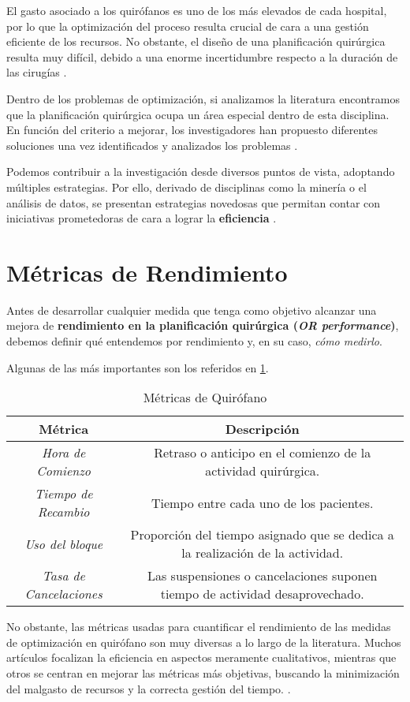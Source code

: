 El gasto asociado a los quirófanos es uno de los más elevados de cada hospital, por lo que la optimización del proceso resulta crucial de cara a una gestión eficiente de los recursos.
No obstante, el diseño de una planificación quirúrgica resulta muy difícil, debido a una enorme incertidumbre respecto a la duración de las cirugías \cite{Celik2023APrinciple}.

Dentro de los problemas de optimización, si analizamos la literatura encontramos que la planificación quirúrgica ocupa un área especial dentro de esta disciplina.
En función del criterio a mejorar, los investigadores han propuesto diferentes soluciones una vez identificados y analizados los problemas \cite{Gur2018ApplicationOverview}.

Podemos contribuir a la investigación desde diversos puntos de vista, adoptando múltiples estrategias.
Por ello, derivado de disciplinas como la minería o el análisis de datos, se presentan estrategias novedosas que permitan contar con iniciativas prometedoras de cara a lograr la \textbf{eficiencia }\cite{Schouten2023OperatingReview}.
\newpage

\section{Métricas de Rendimiento}
Antes de desarrollar cualquier medida que tenga como objetivo alcanzar una mejora de \textbf{rendimiento en la planificación quirúrgica (\textit{OR performance})}, debemos definir qué entendemos por rendimiento y, en su caso, \textit{cómo medirlo}. 

Algunas de las más importantes son los referidos en \ref{Métricas de Quirófano}.
\begin{table}[]
    \centering
    \begin{tabular}{c|c}
        \toprule
            \textbf{Métrica}   &  \textbf{Descripción}  \\
         \midrule
              \textit{Hora de Comienzo}  &  Retraso o anticipo en el comienzo de la actividad quirúrgica. \\
              \textit{Tiempo de Recambio }& Tiempo entre cada uno de los pacientes. \\
              \textit{Uso del bloque} & Proporción del tiempo asignado que se dedica a la realización de la actividad. \\
              \textit{Tasa de Cancelaciones} & Las suspensiones o cancelaciones suponen tiempo de actividad desaprovechado. \\
       \bottomrule
    \end{tabular}
    \caption{Métricas de Quirófano}
    \label{Métricas de Quirófano}
\end{table}
No obstante, las métricas usadas para cuantificar el rendimiento de las medidas de optimización en quirófano son muy diversas a lo largo de la literatura.
Muchos artículos focalizan la eficiencia en aspectos meramente cualitativos, mientras que otros se centran en mejorar las métricas más objetivas, buscando la minimización del malgasto de recursos y la correcta gestión del tiempo. \cite{Schouten2023OperatingReview}.

